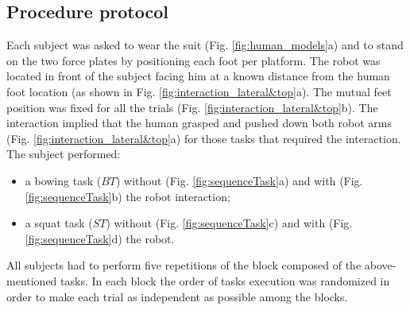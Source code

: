\subsection{Procedure protocol}
Each subject was asked to wear the suit (Fig. \ref{fig:human_models}a) and to stand on the 
two force plates by positioning each foot per platform. The robot 
  was located in front of the subject facing him at a known distance from the human foot
   location (as shown in Fig. \ref{fig:interaction_lateral&top}a). The mutual feet position was
    fixed for all the trials (Fig. \ref{fig:interaction_lateral&top}b).  
	The interaction implied that the human grasped and pushed down both robot arms 
	(Fig. \ref{fig:interaction_lateral&top}a) for those tasks that required the interaction.
	The subject performed:
	\begin{itemize}
		\item a bowing task ($BT$) without (Fig. \ref{fig:sequenceTask}a) and with
		 (Fig. \ref{fig:sequenceTask}b) the robot interaction;
		\item a squat task ($ST$) without (Fig. \ref{fig:sequenceTask}c) and with
		 (Fig. \ref{fig:sequenceTask}d) the robot.
		\end{itemize} 
All subjects had to perform five repetitions of the block composed of the above-mentioned
 tasks. In each block the order of tasks execution was randomized in order to make each 
trial as independent as possible among the blocks.
%
